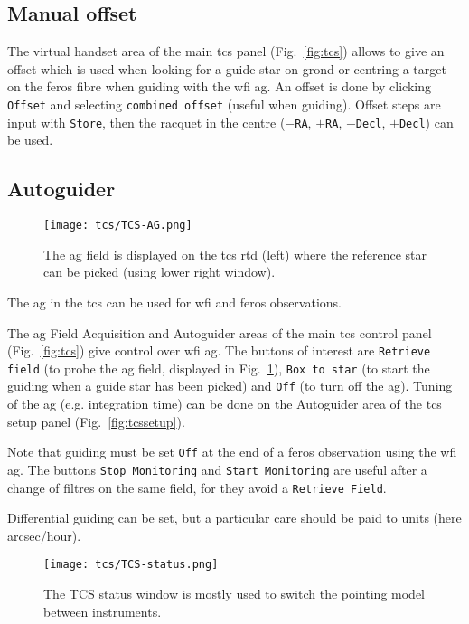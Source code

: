 \documentclass[11pt,fleqn]{book} %
\begin{document}
\subsection{Manual offset}
\label{manualoffset}

The virtual handset area of the main \gls{tcs} panel (Fig.~\ref{fig:tcs})
allows to give an offset which is used when looking for a guide star on
\gls{grond} or centring a target on the \gls{feros} fibre when guiding with the
\gls{wfi} \gls{ag}.  An offset is done by clicking \texttt{Offset} and
selecting \texttt{combined offset} (useful when guiding).  Offset steps are
input with \texttt{Store}, then the racquet in the centre (\texttt{$-$RA},
\texttt{$+$RA}, \texttt{$-$Decl}, \texttt{$+$Decl}) can be used.

\subsection{Autoguider}
\label{autoguider}

\begin{figure}[!ht]
\centering
\texttt{[image: tcs/TCS-AG.png]}
\caption[WFI autoguider]{The \gls{ag} field is displayed on the \gls{tcs} \gls{rtd} (left) where the
 reference star can be picked (using lower right window).} 
\label{fig:tcsag}
\end{figure}
The \gls{ag} in the \gls{tcs} can be used for \gls{wfi} and \gls{feros} observations.

The \gls{ag} Field Acquisition and Autoguider areas of the main \gls{tcs} control panel
(Fig.~\ref{fig:tcs}) give control over \gls{wfi} \gls{ag}.  The buttons of
interest are \texttt{Retrieve field} (to probe the \gls{ag} field, displayed
in Fig.~\ref{fig:tcsag}), \texttt{Box to
star} (to start the guiding when a guide star has been picked) and \texttt{Off}
(to turn off the \gls{ag}).  Tuning of the \gls{ag} (e.g. integration time) can be done 
on  the Autoguider area of the \gls{tcs} setup panel (Fig.~\ref{fig:tcssetup}).

Note that guiding must be set \texttt{Off} at the end of a \gls{feros} observation
using the \gls{wfi} \gls{ag}. The buttons \texttt{Stop Monitoring} and \texttt{Start Monitoring} are
useful after a change of filtres on the same field, for they avoid
a \texttt{Retrieve Field}.

Differential guiding can be set, but a particular care should be paid
to units (here arcsec/hour).


\begin{figure}[!ht]
\centering
\texttt{[image: tcs/TCS-status.png]}
\caption[Status window of the telescope control software]{The TCS status window is mostly used to switch the pointing model
between instruments.}
\label{fig:tcsstatus}
\end{figure}
\end{document}
